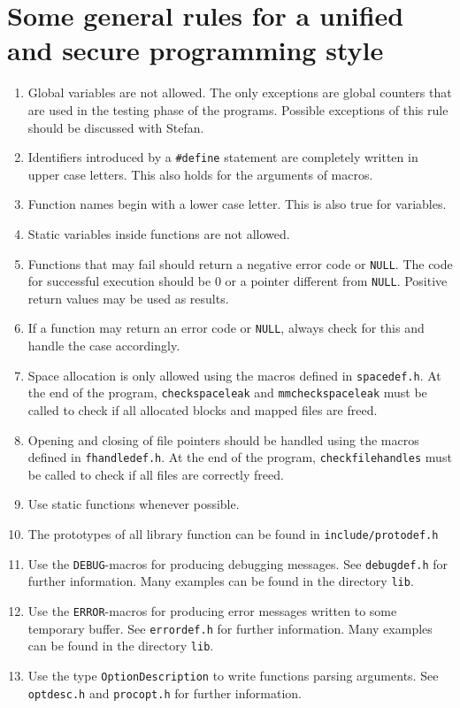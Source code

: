 \documentclass[12pt]{article}
\begin{document}
\section{Some general rules for a unified and secure programming style}
\begin{enumerate}
\item
Global variables are not allowed. The only exceptions are global counters
that are used in the testing phase of the programs. Possible exceptions of this
rule should be discussed with Stefan.
\item
Identifiers introduced by a \texttt{\#define} statement are completely
written in upper case letters. This also holds for the arguments of
macros.
\item
Function names begin with a lower case letter. This is also true for
variables.
\item
Static variables inside functions are not allowed.
\item
Functions that may fail should return a negative error code or \texttt{NULL}.
The code for successful execution should be 0 or a pointer different from
\texttt{NULL}. Positive return values may be used as results.
\item
If a function may return an error code or \texttt{NULL}, always check for
this and handle the case accordingly.
\item
Space allocation is only allowed using the macros
defined in \texttt{spacedef.h}. At the end of the program,
\texttt{checkspaceleak} and \texttt{mmcheckspaceleak} must be called to check
if all allocated blocks and mapped files are freed.
\item
Opening and closing of file pointers should be handled using the
macros defined in \texttt{fhandledef.h}. At the end of the program,
\texttt{checkfilehandles} must be called to check
if all files are correctly freed.
\item
Use static functions whenever possible.
\item
The prototypes of all library function can be found in 
\texttt{include/protodef.h}
\item
Use the \texttt{DEBUG}-macros for producing debugging messages. See
\texttt{debugdef.h} for further information. Many examples can be found in
the directory \texttt{lib}.
\item
Use the \texttt{ERROR}-macros for producing error messages written
to some temporary buffer. See \texttt{errordef.h} for further information. 
Many examples can be found in the directory \texttt{lib}.
\item
Use the type \texttt{OptionDescription} to write functions parsing arguments.
See \texttt{optdesc.h} and \texttt{procopt.h} for further information.
\end{enumerate}
\end{document}
